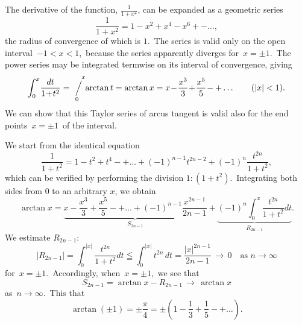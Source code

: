 \documentclass[12pt]{article}
\newcommand{\sijoitus}[2]%
{\operatornamewithlimits{\Big/}_{\!\!\!#1}^{\,#2}}
\theoremstyle{definition}
\begin{document}
The derivative of the  function, $\frac{1}{1+x^2}$, can be expanded as a geometric series
$$\frac{1}{1\!+\!x^2} = 1\!-\!x^2\!+\!x^4\!-\!x^6\!+-\ldots,$$
the radius of convergence of which is $1$.\, The series  is valid only on the open interval\, $-1 < x < 1$,\, because the series apparently diverges for\, $x = \pm 1$.\, The power series may be integrated termwise on its interval of convergence, giving
$$\int_0^x\!\frac{dt}{1\!+\!t^2} = \sijoitus{0}{\quad x}\!\arctan{t} =\arctan{x} = 
x\!-\!\frac{x^3}{3}\!+\!\frac{x^5}{5}\!-+\ldots \qquad (|x| < 1).$$
We can show that this Taylor series of arcus tangent is valid also for the end points\, $x = \pm 1$\, of the interval.

We start from the identical equation
$$\frac{1}{1\!+\!t^2} = 
1\!-\!t^2\!+\!t^4\!-+\ldots+\!(-1)^{n-1}t^{2n-2}+(-1)^n\frac{t^{2n}}{1+t^2},$$
which can be verified by performing the division $1\!:\!(1\!+\!t^2)$.\, Integrating both sides from $0$ to an arbitrary $x$, we obtain
$$\arctan{x} = 
\underbrace{x\!-\!\frac{x^3}{3}\!+\!\frac{x^5}{5}\!-+\ldots+\!(-1)^{n-1}\frac{x^{2n-1}}{2n\!-\!1}}_{S_{2n-1}}+
\underbrace{(-1)^n\int_0^x\frac{t^{2n}}{1+t^2}dt}_{R_{2n-1}}.$$
We estimate $R_{2n-1}$:
$$|R_{2n-1}| = \int_0^{|x|}\frac{t^{2n}}{1+t^2}dt \leqq 
\int_0^{|x|}t^{2n}\,dt = \frac{|x|^{2n-1}}{2n\!-\!1}\,\to\, 0 
\quad\mathrm{as}\,\,n\to\infty$$
for\, $x = \pm 1$.\, Accordingly, when\, $x = \pm 1$,\, we see that
$$S_{2n-1} = \arctan{x}\!-\!R_{2n-1}\,\to\, \arctan{x}$$
as\, $n\to\infty$.\, This  that
$$\arctan{(\pm 1)} = \pm\frac{\pi}{4} =
\pm\left(1\!-\!\frac{1}{3}\!+\!\frac{1}{5}\!-+\ldots\right).$$
\end{document}
